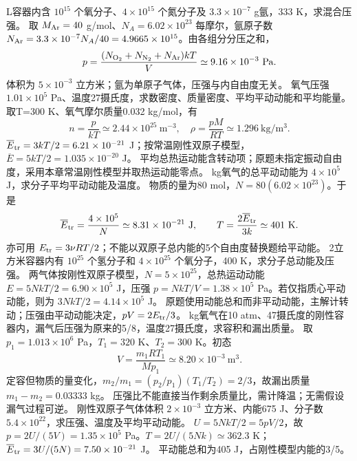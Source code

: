  L容器内含 $10^{15}$ 个氧分子、$4\times10^{15}$ 个氮分子及 $3.3\times10^{-7}$ g氩，333 K，求混合压强。
\workings 取 $M_{\rm Ar}=40$ g/mol、$N_A=6.02\times10^{23}$ 每摩尔，氩原子数 $N_{\rm Ar}=3.3\times10^{-7}N_A/40=4.9665\times10^{15}$。由各组分分压之和，
\[
p=\frac{(N_{\rm O_2}+N_{\rm N_2}+N_{\rm Ar})kT}{V}
\simeq9.16\times10^{-3}\ \mathrm{Pa}.
\]
\crosscheck 体积为 $5\times10^{-3}$ 立方米；氩为单原子气体，压强与内自由度无关。
\problemtext 氧气压强 $1.01\times10^5$ Pa、温度27摄氏度，求数密度、质量密度、平均平动动能和平均能量。
\workings 取T=300 K、氧气摩尔质量0.032 kg/mol，有
\[
n=\frac p{kT}\simeq2.44\times10^{25}\ \mathrm{m}^{-3},\quad
\rho=\frac{pM}{RT}\simeq1.296\ \mathrm{kg/m^3}.
\]
$\overline E_{\rm tr}=3kT/2=6.21\times10^{-21}$ J；按常温刚性双原子模型，$\overline E=5kT/2=1.035\times10^{-20}$ J。
\crosscheck 平均总热运动能含转动项；原题未指定振动自由度，采用本章常温刚性模型并取热运动能零点。
 kg氧气的总平动动能为 $4\times10^5$ J，求分子平均平动动能及温度。
\workings 物质的量为80 mol，$N=80(6.02\times10^{23})$。于是
\[
\overline E_{\rm tr}=\frac{4\times10^5}{N}\simeq8.31\times10^{-21}\ \mathrm J,\qquad
T=\frac{2\overline E_{\rm tr}}{3k}\simeq401\ \mathrm K.
\]
\crosscheck 亦可用 $E_{\rm tr}=3\nu RT/2$；不能以双原子总内能的5个自由度替换题给平动能。
\problemtext 2立方米容器内有 $10^{25}$ 个氢分子和 $4\times10^{25}$ 个氧分子，400 K，求分子总动能及压强。
\workings 两气体按刚性双原子模型，$N=5\times10^{25}$，总热运动动能 $E=5NkT/2=6.90\times10^5$ J，压强 $p=NkT/V=1.38\times10^5$ Pa。若仅指质心平动动能，则为 $3NkT/2=4.14\times10^5$ J。
\crosscheck 原题使用动能总和而非平动动能，主解计转动；压强由平动动能决定，$pV=2E_{\rm tr}/3$。
 kg氧气在10 atm、47摄氏度的刚性容器内，漏气后压强为原来的5/8，温度27摄氏度，求容积和漏出质量。
\workings 取 $p_1=1.013\times10^6$ Pa，$T_1=320$ K、$T_2=300$ K。初态
\[
V=\frac{m_1 RT_1}{Mp_1}\simeq8.20\times10^{-3}\ \mathrm{m^3}.
\]
定容但物质的量变化，$m_2/m_1=(p_2/p_1)(T_1/T_2)=2/3$，故漏出质量 $m_1-m_2=0.03333$ kg。
\crosscheck 压强比不能直接当作剩余质量比，需计降温；无需假设漏气过程可逆。
\problemtext 刚性双原子气体体积 $2\times10^{-3}$ 立方米、内能675 J、分子数 $5.4\times10^{22}$，求压强、温度及平均平动动能。
\workings $U=5NkT/2=5pV/2$，故 $p=2U/(5V)=1.35\times10^5$ Pa。$T=2U/(5Nk)\simeq362.3$ K；$\overline E_{\rm tr}=3U/(5N)=7.50\times10^{-21}$ J。
\crosscheck 平动能总和为405 J，占刚性模型内能的3/5。
